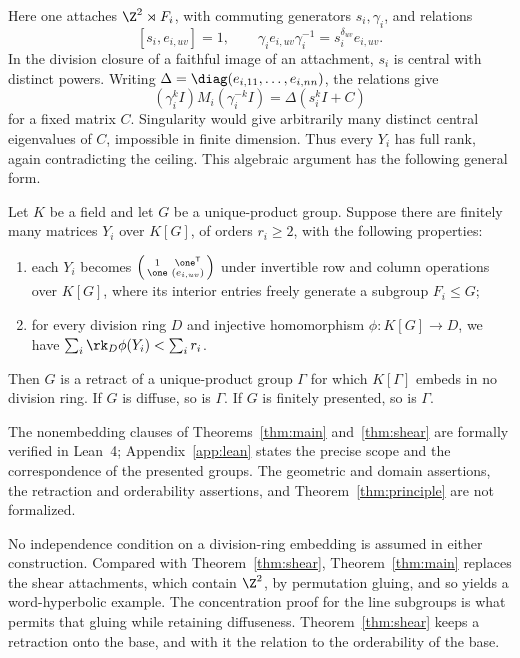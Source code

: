 Here one attaches \(\Z^2\rtimes F_i\), with commuting generators
\(s_i,\gamma_i\), and relations
\[
 [s_i,e_{i,uv}]=1,\qquad
 \gamma_i e_{i,uv}\gamma_i^{-1}=s_i^{\delta_{uv}}e_{i,uv}.
\]
In the division closure of a faithful image of an attachment,
\(s_i\) is central with distinct powers. Writing
\(\Delta=\diag(e_{i,11},\ldots,e_{i,nn})\), the relations give
\begin{equation}\label{eq:intro-conjugacy}
 (\gamma_i^kI)M_i(\gamma_i^{-k}I)=\Delta(s_i^kI+C)
\end{equation}
for a fixed matrix \(C\). Singularity would give arbitrarily many
distinct central eigenvalues of \(C\), impossible in finite dimension.
Thus every \(Y_i\) has full rank, again contradicting the ceiling.
This algebraic argument has the following general form.

\begin{maintheorem}\label{thm:principle}
Let \(K\) be a field and let \(G\) be a unique-product group. Suppose
there are finitely many matrices \(Y_i\) over \(K[G]\), of orders
\(r_i\ge2\), with the following properties:
\begin{enumerate}
\item each \(Y_i\) becomes
\(\left(\begin{smallmatrix}1&\one^{\mathsf T}\\
\one&(e_{i,uv})\end{smallmatrix}\right)\)
under invertible row and column operations over \(K[G]\), where its
interior entries freely generate a subgroup \(F_i\le G\);
\item for every division ring \(D\) and injective homomorphism
\(\phi:K[G]\to D\), we have \(\sum_i\rk_D\phi(Y_i)<\sum_i r_i\).
\end{enumerate}
Then \(G\) is a retract of a unique-product group \(\Gamma\) for which
\(K[\Gamma]\) embeds in no division ring. If \(G\) is diffuse, so is
\(\Gamma\). If \(G\) is finitely presented, so is \(\Gamma\).
\end{maintheorem}

The nonembedding clauses of Theorems~\ref{thm:main} and~\ref{thm:shear}
are formally verified in Lean~4; Appendix~\ref{app:lean} states the
precise scope and the correspondence of the presented groups.
The geometric and domain assertions, the retraction and orderability
assertions, and Theorem~\ref{thm:principle} are not formalized.

No independence condition on a division-ring embedding is assumed in
either construction. Compared with Theorem~\ref{thm:shear},
Theorem~\ref{thm:main} replaces the shear attachments, which contain
\(\Z^2\), by permutation gluing, and so yields a word-hyperbolic
example. The concentration proof for the line subgroups is what
permits that gluing while retaining diffuseness. Theorem~\ref{thm:shear}
keeps a retraction onto the base, and with it the relation to the
orderability of the base.

